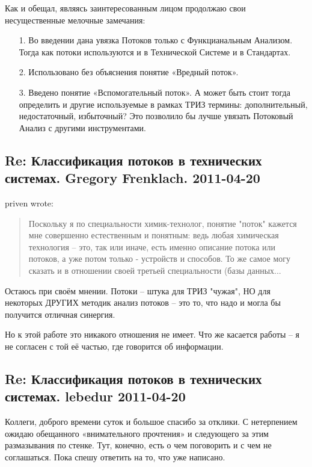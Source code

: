 \documentclass[a4paper,11pt]{article}
\begin{document}
Как и обещал, являясь заинтересованным лицом продолжаю свои несущественные
мелочные замечания:
\begin{itemize}
\item[1.] Во введении дана увязка Потоков только с Функцианальным Анализом.
  Тогда как потоки используются и в Технической Системе и в Стандартах.
\item[2.] Использовано без объяснения понятие «Вредный поток».
\item[3.] Введено понятие «Вспомогательный поток». А может быть стоит тогда
  определить и другие используемые в рамках ТРИЗ термины: дополнительный,
  недостаточный, избыточный? Это позволило бы лучше увязать Потоковый Анализ с
  другими инструментами.
\end{itemize}

\subsection*{Re: Классификация потоков в технических системах. Gregory
  Frenklach. 2011-04-20}

priven wrote:
\begin{quote}
  Поскольку я по специальности химик-технолог, понятие "поток" кажется мне
  совершенно естественным и понятным: ведь любая химическая технология -- это,
  так или иначе, есть именно описание потока или потоков, а уже потом только -
  устройств и способов. То же самое могу сказать и в отношении своей третьей
  специальности (базы данных...
\end{quote}
Остаюсь при своём мнении.  Потоки -- штука для ТРИЗ "чужая", НО для некоторых
ДРУГИХ методик анализ потоков -- это то, что надо и могла бы получится отличная
синергия.

Но к этой работе это никакого отношения не имеет.  Что же касается работы -- я
не согласен с той её частью, где говорится об информации.

\subsection*{Re: Классификация потоков в технических системах. lebedur
  2011-04-20} 

Коллеги, доброго времени суток и большое спасибо за отклики.  С нетерпением
ожидаю обещанного «внимательного прочтения» и следующего за этим размазывания
по стенке. Тут, конечно, есть о чем поговорить и с чем не соглашаться.  Пока
спешу ответить на то, что уже написано.
\end{document}
